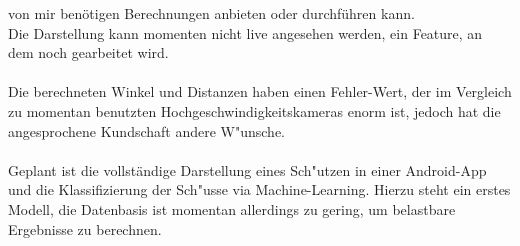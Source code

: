 von mir benötigen Berechnungen anbieten oder durchführen kann.\\
Die Darstellung kann momenten nicht live angesehen werden, ein Feature, an dem noch
gearbeitet wird.\\
\\
Die berechneten Winkel und Distanzen haben einen Fehler-Wert, der im Vergleich
zu momentan benutzten Hochgeschwindigkeitskameras enorm ist, jedoch 
hat die angesprochene Kundschaft andere W"unsche.\\
\\
Geplant ist die vollständige Darstellung eines Sch"utzen in einer Android-App
und die Klassifizierung der Sch"usse via Machine-Learning. Hierzu steht ein erstes Modell,
die Datenbasis ist momentan allerdings zu gering, um belastbare Ergebnisse zu berechnen.
